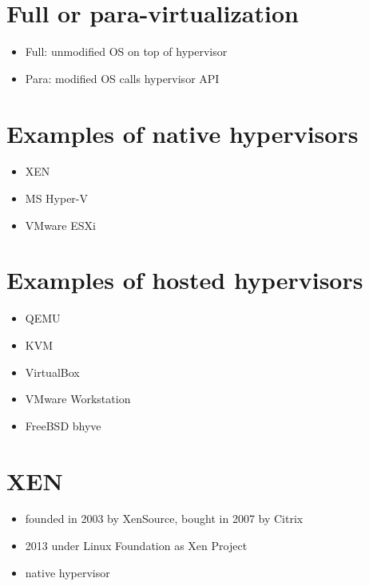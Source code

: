 \documentclass[11pt]{article}
\begin{document}
\section*{Full or para-virtualization}
\label{sec:org580ffeb}
\begin{itemize}
\item Full: unmodified OS on top of hypervisor
\item Para: modified OS calls hypervisor API
\end{itemize}

\section*{Examples of native hypervisors}
\label{sec:orga7382ae}
\begin{itemize}
\item XEN
\item MS Hyper-V
\item VMware ESXi
\end{itemize}

\section*{Examples of hosted hypervisors}
\label{sec:orgb63b0d4}
\begin{itemize}
\item QEMU
\item KVM
\item VirtualBox
\item VMware Workstation
\item FreeBSD bhyve
\end{itemize}

\section*{XEN}
\label{sec:org0bed709}
\begin{itemize}
\item founded in 2003 by XenSource, bought in 2007 by Citrix
\item 2013 under Linux Foundation as Xen Project
\item native hypervisor
\end{itemize}
\end{document}
